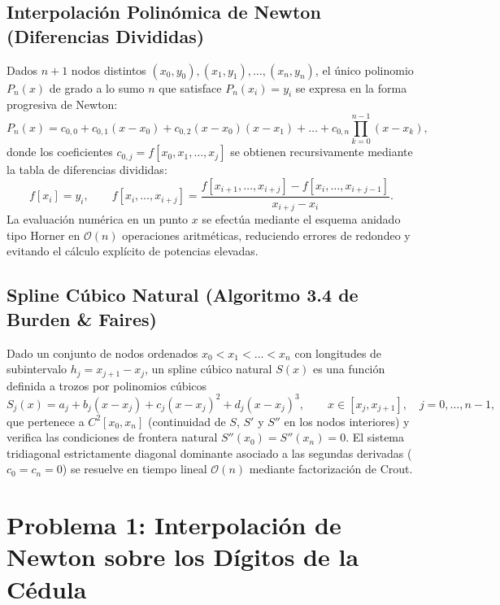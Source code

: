\documentclass[11pt,letterpaper]{article}
\begin{document}
\subsection{Interpolación Polinómica de Newton (Diferencias Divididas)}
Dados $n+1$ nodos distintos $(x_0, y_0), (x_1, y_1), \dots, (x_n, y_n)$, el único polinomio $P_n(x)$ de grado a lo sumo $n$ que satisface $P_n(x_i) = y_i$ se expresa en la forma progresiva de Newton:
\begin{equation}
    P_n(x) = c_{0,0} + c_{0,1}(x - x_0) + c_{0,2}(x - x_0)(x - x_1) + \dots + c_{0,n}\prod_{k=0}^{n-1}(x - x_k),
\end{equation}
donde los coeficientes $c_{0,j} = f[x_0, x_1, \dots, x_j]$ se obtienen recursivamente mediante la tabla de diferencias divididas:
\begin{equation}
    f[x_i] = y_i, \qquad f[x_i, \dots, x_{i+j}] = \frac{f[x_{i+1}, \dots, x_{i+j}] - f[x_i, \dots, x_{i+j-1}]}{x_{i+j} - x_i}.
\end{equation}
La evaluación numérica en un punto $x$ se efectúa mediante el esquema anidado tipo Horner en $\mathcal{O}(n)$ operaciones aritméticas, reduciendo errores de redondeo y evitando el cálculo explícito de potencias elevadas.

\subsection{Spline Cúbico Natural (Algoritmo 3.4 de Burden \& Faires)}
Dado un conjunto de nodos ordenados $x_0 < x_1 < \dots < x_n$ con longitudes de subintervalo $h_j = x_{j+1} - x_j$, un spline cúbico natural $S(x)$ es una función definida a trozos por polinomios cúbicos
\begin{equation}
    S_j(x) = a_j + b_j(x - x_j) + c_j(x - x_j)^2 + d_j(x - x_j)^3, \qquad x \in [x_j, x_{j+1}], \quad j = 0, \dots, n-1,
\end{equation}
que pertenece a $C^2[x_0, x_n]$ (continuidad de $S$, $S'$ y $S''$ en los nodos interiores) y verifica las condiciones de frontera natural $S''(x_0) = S''(x_n) = 0$. El sistema tridiagonal estrictamente diagonal dominante asociado a las segundas derivadas ($c_0 = c_n = 0$) se resuelve en tiempo lineal $\mathcal{O}(n)$ mediante factorización de Crout.

\section{Problema 1: Interpolación de Newton sobre los Dígitos de la Cédula}
\end{document}

